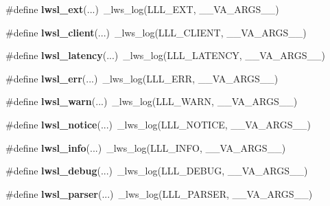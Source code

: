 \begin{DoxyCompactItemize}
\#define {\bfseries lwsl\+\_\+ext}(...)~\+\_\+lws\+\_\+log(L\+L\+L\+\_\+\+E\+XT, \+\_\+\+\_\+\+V\+A\+\_\+\+A\+R\+G\+S\+\_\+\+\_\+)
\item 
\mbox{\label{group__log_ga181ea1ed9ba604e493ce092850d9da90}} 
\#define {\bfseries lwsl\+\_\+client}(...)~\+\_\+lws\+\_\+log(L\+L\+L\+\_\+\+C\+L\+I\+E\+NT, \+\_\+\+\_\+\+V\+A\+\_\+\+A\+R\+G\+S\+\_\+\+\_\+)
\item 
\mbox{\label{group__log_gab5842ee4ec5f763d057869e083ff1cb0}} 
\#define {\bfseries lwsl\+\_\+latency}(...)~\+\_\+lws\+\_\+log(L\+L\+L\+\_\+\+L\+A\+T\+E\+N\+CY, \+\_\+\+\_\+\+V\+A\+\_\+\+A\+R\+G\+S\+\_\+\+\_\+)
\item 
\mbox{\label{group__log_gad44c15d00076052a398244035a7dbb56}} 
\#define {\bfseries lwsl\+\_\+err}(...)~\+\_\+lws\+\_\+log(L\+L\+L\+\_\+\+E\+RR, \+\_\+\+\_\+\+V\+A\+\_\+\+A\+R\+G\+S\+\_\+\+\_\+)
\item 
\mbox{\label{group__log_ga1bcd293826c0a91d6e7ac3c54db72885}} 
\#define {\bfseries lwsl\+\_\+warn}(...)~\+\_\+lws\+\_\+log(L\+L\+L\+\_\+\+W\+A\+RN, \+\_\+\+\_\+\+V\+A\+\_\+\+A\+R\+G\+S\+\_\+\+\_\+)
\item 
\mbox{\label{group__log_ga86b3c56c638569eb93919c52a1d5dfaf}} 
\#define {\bfseries lwsl\+\_\+notice}(...)~\+\_\+lws\+\_\+log(L\+L\+L\+\_\+\+N\+O\+T\+I\+CE, \+\_\+\+\_\+\+V\+A\+\_\+\+A\+R\+G\+S\+\_\+\+\_\+)
\item 
\mbox{\label{group__log_gaf13957a4d9fb47c070b9320303c32502}} 
\#define {\bfseries lwsl\+\_\+info}(...)~\+\_\+lws\+\_\+log(L\+L\+L\+\_\+\+I\+N\+FO, \+\_\+\+\_\+\+V\+A\+\_\+\+A\+R\+G\+S\+\_\+\+\_\+)
\item 
\mbox{\label{group__log_ga74a1a3d4d96b146a0ac45faab0028ade}} 
\#define {\bfseries lwsl\+\_\+debug}(...)~\+\_\+lws\+\_\+log(L\+L\+L\+\_\+\+D\+E\+B\+UG, \+\_\+\+\_\+\+V\+A\+\_\+\+A\+R\+G\+S\+\_\+\+\_\+)
\item 
\mbox{\label{group__log_gaee051a14945bec746ed3b527f384dc72}} 
\#define {\bfseries lwsl\+\_\+parser}(...)~\+\_\+lws\+\_\+log(L\+L\+L\+\_\+\+P\+A\+R\+S\+ER, \+\_\+\+\_\+\+V\+A\+\_\+\+A\+R\+G\+S\+\_\+\+\_\+)
\item 

\end{DoxyCompactItemize}
